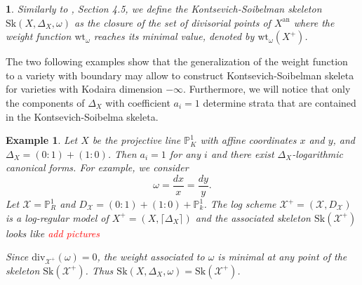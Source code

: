 \documentclass{amsart}%
\numberwithin{equation}{subsection}
\theoremstyle{plain2}
\theoremstyle{definition2}
\newtheorem{example}[equation]{Example}
\theoremstyle{stepstyle}
\theoremstyle{point}
\theoremstyle{subpoint}
\newtheorem{subpoint}[equation]{}%
\newcommand{\spa}[1]{\begin{subpoint}#1\end{subpoint}}           %
\newcommand{\cX}{\ensuremath{\mathscr{X}}}
\newcommand{\divisor}{\mathrm{div}}
\newcommand{\weight}{\mathrm{wt}}
\newcommand{\Sk}{\mathrm{Sk}}
\begin{document}
\spa{Similarly to \cite{MustataNicaise}, Section 4.5, we define the Kontsevich-Soibelman skeleton $\Sk(X, \Delta_X, \omega)$ as the closure of the set of divisorial points of $X^\text{an}$ where the weight function $\weight_\omega$ reaches its minimal value, denoted by $\weight_{\omega}(X^+)$.}

The two following examples show that the generalization of the weight function to a variety with boundary may allow to construct Kontsevich-Soibelman skeleta for varieties with Kodaira dimension $-\infty$. Furthermore, we will notice that  only the components of $\Delta_X$ with coefficient $a_i=1$ determine strata that are contained in the Kontsevich-Soibelma skeleta.

\begin{example}
Let $X$ be the projective line $\mathbb{P}^1_K$ with affine coordinates $x$ and $y$, and $\Delta_X=(0:1) + (1:0)$. Then $a_i=1$ for any $i$ and there exist $\Delta_X$-logarithmic canonical forms. For example, we consider $$\omega =  \frac{dx}{x}= \frac{dy}{y}.$$ Let $\cX= \mathbb{P}_R^1$ and $D_\cX= (0:1) + (1:0)+ \mathbb{P}^1_k$. The log scheme $\cX^+=(\cX,D_\cX)$ is a log-regular model of $X^+=(X,\lceil \Delta_X \rceil)$ and the associated skeleton $\Sk(\cX^+)$ looks like \textcolor{red}{add pictures}

Since $\divisor_{\cX^+}(\omega)= 0$, the weight associated to $\omega$ is minimal at any point of the skeleton $\Sk(\cX^+)$. Thus $\Sk(X,\Delta_X,\omega)=\Sk(\cX^+)$.
\end{example}
\end{document}
